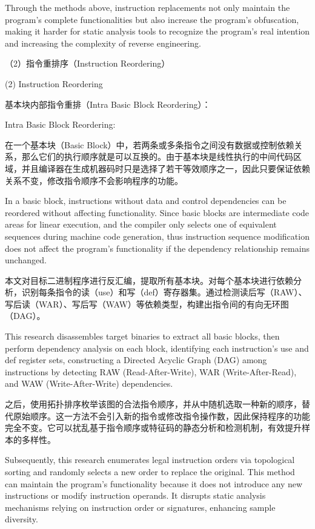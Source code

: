 Through the methods above, instruction replacements not only maintain the program's complete functionalities but also increase the program's obfuscation, making it harder for static analysis tools to recognize the program's real intention and increasing the complexity of reverse engineering.

（2）指令重排序（Instruction Reordering）

(2) Instruction Reordering

基本块内部指令重排（Intra Basic Block Reordering）：

Intra Basic Block Reordering:

在一个基本块（Basic Block）中，若两条或多条指令之间没有数据或控制依赖关系，那么它们的执行顺序就是可以互换的。由于基本块是线性执行的中间代码区域，并且编译器在生成机器码时只是选择了若干等效顺序之一，因此只要保证依赖关系不变，修改指令顺序不会影响程序的功能。

In a basic block, instructions without data and control dependencies can be reordered without affecting functionality. Since basic blocks are intermediate code areas for linear execution, and the compiler only selects one of equivalent sequences during machine code generation, thus instruction sequence modification does not affect the program's functionality if the dependency relationship remains unchanged.

本文对目标二进制程序进行反汇编，提取所有基本块。对每个基本块进行依赖分析，识别每条指令的读（use）和写（def）寄存器集。通过检测读后写（RAW）、写后读（WAR）、写后写（WAW）等依赖类型，构建出指令间的有向无环图（DAG）。

This research disassembles target binaries to extract all basic blocks, then perform dependency analysis on each block, identifying each instruction's use and def register sets, constructing a Directed Acyclic Graph (DAG) among instructions by detecting RAW (Read-After-Write), WAR (Write-After-Read), and WAW (Write-After-Write) dependencies.

之后，使用拓扑排序枚举该图的合法指令顺序，并从中随机选取一种新的顺序，替代原始顺序。这一方法不会引入新的指令或修改指令操作数，因此保持程序的功能完全不变。它可以扰乱基于指令顺序或特征码的静态分析和检测机制，有效提升样本的多样性。

Subsequently, this research enumerates legal instruction orders via topological sorting and randomly selects a new order to replace the original. This method can maintain the program's functionality because it does not introduce any new instructions or modify instruction operands. It disrupts static analysis mechanisms relying on instruction order or signatures, enhancing sample diversity.

